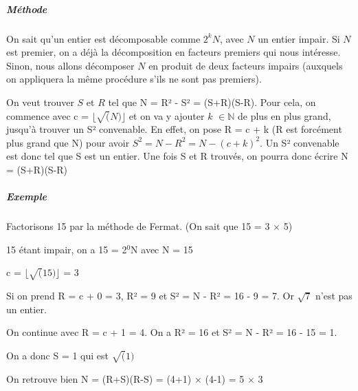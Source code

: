 \documentclass[11pt,a4paper]{article}
\begin{document}
	
		\subparagraph{Méthode}
	On sait qu'un entier est décomposable comme $2^{k}N$, avec $\mathit{N}$ un entier impair. Si $\mathit{N}$ est premier, on a déjà la décomposition en facteurs premiers qui nous intéresse. Sinon, nous allons décomposer $\mathit{N}$ en produit de deux facteurs impairs (auxquels on appliquera la même procédure s'ils ne sont pas premiers). 
	
	On veut trouver $\mathit{S}$ et $\mathit{R}$ tel que N = R² - S² = (S+R)(S-R). 
	Pour cela, on commence avec c = $\lfloor \sqrt(N)\rfloor$ et on va y ajouter $\mathit{k}$ $\in\mathbb{N}$ de plus en plus grand, jusqu'à trouver un S² convenable. En effet, on pose R = c + k (R est forcément plus grand que N) pour avoir
	 $\mathit{S^{2} = N - R^{2} = N - (c+k)^{2}}$.
	 Un S² convenable est donc tel que S est un entier. Une fois S et R trouvés, on pourra donc écrire N = (S+R)(S-R)
		\subparagraph{Exemple}
	Factorisons 15 par la méthode de Fermat. (On sait que 15 = 3 $\times$  5)
	
	15 étant impair, on a 15 = 2$^{0}$N avec N = 15
	
	c = $\lfloor \sqrt(15)\rfloor$ = 3
	
	Si on prend R = c + 0 = 3, R² = 9 et S² = N - R² = 16 - 9 = 7. Or $\sqrt{7}$ n'est pas un entier. 
	
	On continue avec R = c + 1 = 4. On a R² = 16 et S² = N - R² = 16 - 15 = 1.
	
	On a donc S = 1 qui est $\sqrt(1)$
	
	On retrouve bien N = (R+S)(R-S) = (4+1) $\times$  (4-1) = 5 $\times$ 3
	\newpage
	
	
\end{document}
